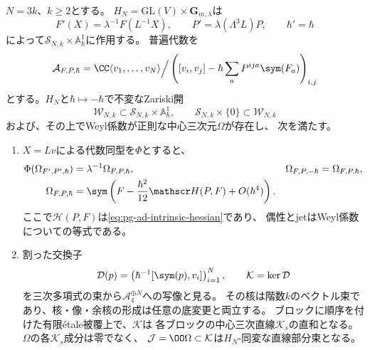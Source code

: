 \begin{theorem}[満support層の全係数にわたる同変中心元]
\label{thm:pg-intrinsic-full-support-center}
$N=3k$、$k\ge2$とする。
$H_N=\mathrm{GL}(V)\times\mathbf G_{m,\lambda}$は
\begin{equation}
 F'(X)=\lambda^{-1}F(L^{-1}X),\qquad
 P'=\lambda(\Lambda^3L)P,\qquad
 \hbar'=\hbar
 \label{eq:pg-full-support-group-action}
\end{equation}
によって$\mathcal S_{N,k}\times\mathbb A^1_\hbar$に作用する。
普遍代数を
\begin{equation}
 \mathcal A_{F,P,\hbar}
 =\CC\langle v_1,\ldots,v_N\rangle\Big/
 \left([v_i,v_j]-\hbar\sum_aP^{ija}\sym(F_a)\right)_{i,j}
 \label{eq:pg-full-support-ambient-algebra}
\end{equation}
とする。$H_N$と$\hbar\mapsto-\hbar$で不変なZariski開
\begin{equation}
 \mathcal W_{N,k}\subset\mathcal S_{N,k}\times\mathbb A^1_\hbar,
 \qquad
 \mathcal S_{N,k}\times\{0\}\subset\mathcal W_{N,k}
 \label{eq:pg-full-support-good-open}
\end{equation}
および、その上でWeyl係数が正則な中心三次元$\Omega$が存在し、
次を満たす。
\begin{enumerate}
\item $X=Lv$による代数同型を$\Phi$とすると、
\begin{equation}
 \begin{aligned}
 \Phi(\Omega_{F',P',\hbar})&=\lambda^{-1}\Omega_{F,P,\hbar},&
 \Omega_{F,P,-\hbar}&=\Omega_{F,P,\hbar},\\
 \Omega_{F,P,\hbar}
 &=\sym\left(F-\frac{\hbar^2}{12}\mathscr H(P,F)
                  +O(\hbar^4)\right).
 \end{aligned}
 \label{eq:pg-full-support-equivariant-jet}
\end{equation}
ここで$\mathscr H(P,F)$は\eqref{eq:pg-ad-intrinsic-hessian}であり、
偶性とjetはWeyl係数についての等式である。
\item 割った交換子
\begin{equation}
 \mathcal D(p)=
 \left(\hbar^{-1}[\sym(p),v_i]\right)_{i=1}^N,
 \qquad\mathcal K=\ker\mathcal D
 \label{eq:pg-full-support-divided-kernel}
\end{equation}
を三次多項式の束から$\mathcal A_4^{\oplus N}$への写像と見る。
その核は階数$k$のベクトル束であり、核・像・余核の形成は任意の底変更と両立する。
ブロックに順序を付けた有限\'{e}tale被覆上で、$\mathcal K$は
各ブロックの中心三次直線$\mathcal K_s$の直和となる。
$\Omega$の各$\mathcal K_s$成分は零でなく、
$\mathcal J=\OO\Omega\subset\mathcal K$は$H_N$-同変な直線部分束となる。

\end{enumerate}
\end{theorem}
